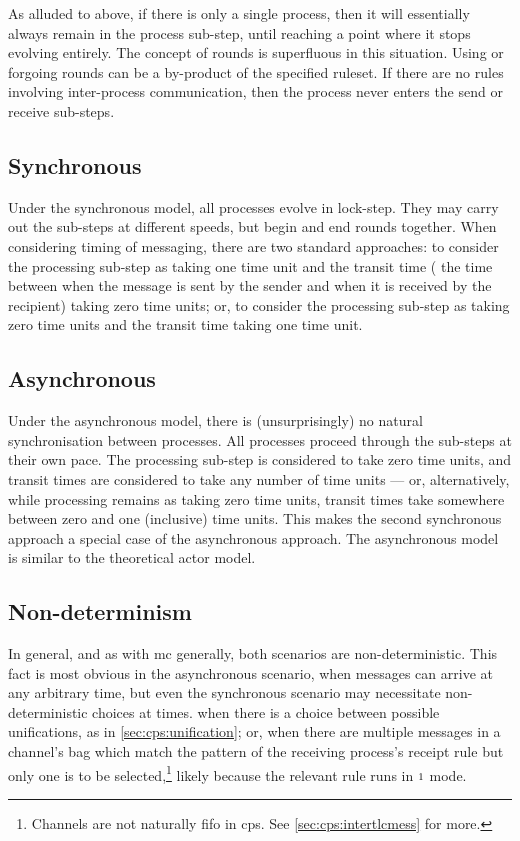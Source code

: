 As alluded to above, if there is only a single process, then it will essentially always remain in the process sub-step, until reaching a point where it stops evolving entirely.  The concept of rounds is superfluous in this situation.  Using or forgoing rounds can be a by-product of the specified \gls{ruleset}.  If there are no rules involving inter-process communication, then the process never enters the send or receive sub-steps.

\subsection{Synchronous}
Under the synchronous model, all processes evolve in lock-step.  They may carry out the sub-steps at different speeds, but begin and end rounds together.  When considering timing of messaging, there are two standard approaches:  to consider the processing sub-step as taking one time unit and the transit time (\ie{} the time between when the message is sent by the sender and when it is received by the recipient) taking zero time units; or, to consider the processing sub-step as taking zero time units and the transit time taking one time unit.

\subsection{Asynchronous}
Under the asynchronous model, there is (unsurprisingly) no natural synchronisation between processes.  All processes proceed through the sub-steps at their own pace.  The processing sub-step is considered to take zero time units, and transit times are considered to take any number of time units --- or, alternatively, while processing remains as taking zero time units, transit times take somewhere between zero and one (inclusive) time units.  This makes the second synchronous approach a special case of the asynchronous approach.  The asynchronous model is similar to the theoretical \gls{actor} model.

\subsection{Non-determinism}
In general, and as with \gls{mc} generally, both scenarios are non-deterministic.  This fact is most obvious in the asynchronous scenario, when messages can arrive at any arbitrary time, but even the synchronous scenario may necessitate non-deterministic choices at times.  \Eg{} when there is a choice between possible unifications, as in \cref{sec:cps:unification}; or, when there are multiple messages in a channel's bag which match the pattern of the receiving process's receipt rule but only one is to be selected,\footnote{Channels are not naturally \gls{fifo} in \gls{cps}.  See \vref{sec:cps:intertlcmess} for more.} likely because the relevant rule runs in \({\scriptstyle 1}\) mode.

